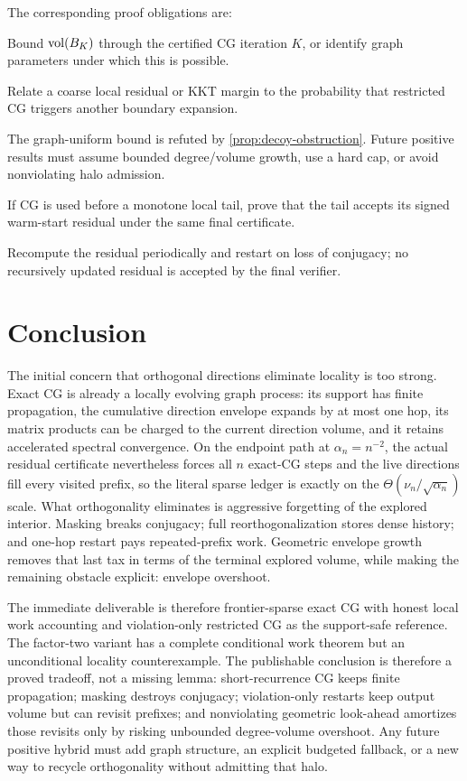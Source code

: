 \documentclass[11pt]{article}
\begin{document}
The corresponding proof obligations are:
\begin{description}[style=nextline,leftmargin=3.4cm]
 \item[Ball confinement for FCG.] Bound $\operatorname{vol}(B_K)$ through the certified CG
 iteration $K$, or identify graph parameters under which this is possible.
 \item[Envelope sufficiency.] Relate a coarse local residual or KKT margin to
 the probability that restricted CG triggers another boundary expansion.
 \item[Envelope overshoot.] The graph-uniform bound is refuted by
 \cref{prop:decoy-obstruction}. Future positive results must assume bounded
 degree/volume growth, use a hard cap, or avoid nonviolating halo admission.
 \item[Signed handoff.] If CG is used before a monotone local tail, prove that
 the tail accepts its signed warm-start residual under the same final
 certificate.
 \item[Finite precision.] Recompute the residual periodically and restart on
 loss of conjugacy; no recursively updated residual is accepted by the final
 verifier.
\end{description}

\section{Conclusion}

The initial concern that orthogonal directions eliminate locality is too
strong. Exact CG is already a locally evolving graph process: its support has
finite propagation, the cumulative direction envelope expands by at most one
hop, its matrix products can be charged to the current direction volume, and
it retains accelerated spectral convergence.  On the endpoint path at
$\alpha_n=n^{-2}$, the actual residual certificate nevertheless forces all
$n$ exact-CG steps and the live directions fill every visited prefix, so the
literal sparse ledger is exactly on the
$\Theta(\nu_n/\sqrt{\alpha_n})$ scale.  What
orthogonality eliminates is aggressive forgetting of the explored interior.
Masking breaks conjugacy; full reorthogonalization stores dense history; and
one-hop restart pays repeated-prefix work. Geometric envelope growth removes
that last tax in terms of the terminal explored volume, while making the
remaining obstacle explicit: envelope overshoot.

The immediate deliverable is therefore frontier-sparse exact CG with honest
local work accounting and violation-only restricted CG as the support-safe
reference. The factor-two variant has a complete conditional work theorem but
an unconditional locality counterexample. The publishable conclusion is
therefore a proved tradeoff, not a missing lemma: short-recurrence CG keeps
finite propagation; masking destroys conjugacy; violation-only restarts keep
output volume but can revisit prefixes; and nonviolating geometric look-ahead
amortizes those revisits only by risking unbounded degree-volume overshoot.
Any future positive hybrid must add graph structure, an explicit budgeted
fallback, or a new way to recycle orthogonality without admitting that halo.



\end{document}
